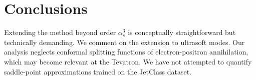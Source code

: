 \section{Conclusions}\label{sec:conclusions}

Extending the method beyond order $\alpha_s^3$ is conceptually
straightforward but technically demanding. We comment on the extension
to ultrasoft modes. Our analysis neglects conformal splitting functions
of electron-positron annihilation, which may become relevant at the
Tevatron. We have not attempted to quantify saddle-point approximations
trained on the JetClass dataset.

